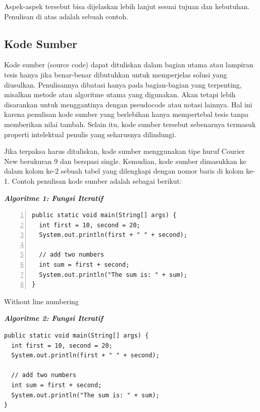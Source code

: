 Aspek-aspek tersebut bisa dijelaskan lebih lanjut sesuai tujuan dan kebutuhan. Penulisan di atas adalah sebuah contoh. 

\subsection{Kode Sumber}

Kode sumber (source code) dapat dituliskan dalam bagian utama atau lampiran tesis hanya jika benar-benar dibutuhkan untuk memperjelas solusi yang diusulkan. Penulisannya dibatasi hanya pada bagian-bagian yang terpenting, misalkan metode atau algoritme utama yang digunakan. Akan tetapi lebih disarankan untuk menggantinya dengan pseudocode atau notasi lainnya. Hal ini karena penulisan kode sumber yang berlebihan hanya mempertebal tesis tanpa memberikan nilai tambah. Selain itu, kode sumber tersebut sebenarnya termasuk properti intelektual penulis yang seharusnya dilindungi. 

Jika terpaksa harus dituliskan, kode sumber menggunakan tipe huruf Courier New berukuran 9 dan berspasi single. Kemudian, kode sumber dimasukkan ke dalam kolom ke-2 sebuah tabel yang dilengkapi dengan nomor baris di kolom ke-1. Contoh penulisan kode sumber adalah sebagai berikut: 

\noindent\textbf{\textit{Algoritme 1: Fungsi Iteratif}}
\begin{Verbatim}[numbers=left,xleftmargin=5mm,fontsize=\small]
public static void main(String[] args) {    
  int first = 10, second = 20;
  System.out.println(first + " " + second);

  // add two numbers
  int sum = first + second;
  System.out.println("The sum is: " + sum);
}
\end{Verbatim}

\noindent Without line numbering

\noindent\textbf{\textit{Algoritme 2: Fungsi Iteratif}}

\begin{Verbatim}[fontsize=\small]
public static void main(String[] args) {    
  int first = 10, second = 20;
  System.out.println(first + " " + second);

  // add two numbers
  int sum = first + second;
  System.out.println("The sum is: " + sum);
}
\end{Verbatim}